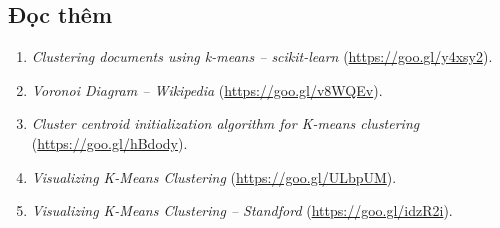\subsection{Đọc thêm}

\begin{enumerate}
\item \textit{Clustering documents using k-means -- scikit-learn} (\url{https://goo.gl/y4xsy2}).

\item \textit{Voronoi Diagram -- Wikipedia} (\url{https://goo.gl/v8WQEv}).

\item \textit{Cluster centroid initialization algorithm for K-means clustering} (\url{https://goo.gl/hBdody}).

\item \textit{Visualizing K-Means Clustering} (\url{https://goo.gl/ULbpUM}).

\item \textit{Visualizing K-Means Clustering -- Standford} (\url{https://goo.gl/idzR2i}).

\end{enumerate}

